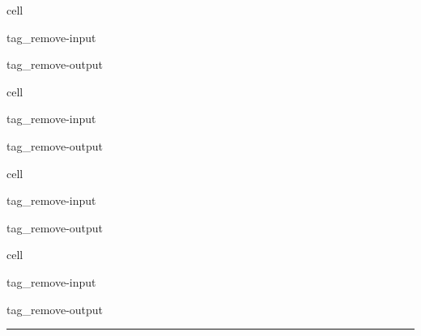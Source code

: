 \documentclass[letterpaper,10pt,english]{jupyterBook}
\begin{document}
\begin{sphinxuseclass}{cell}
\begin{sphinxuseclass}{tag_remove-input}
\begin{sphinxuseclass}{tag_remove-output}
\end{sphinxuseclass}
\end{sphinxuseclass}
\end{sphinxuseclass}
\begin{sphinxuseclass}{cell}
\begin{sphinxuseclass}{tag_remove-input}
\begin{sphinxuseclass}{tag_remove-output}
\end{sphinxuseclass}
\end{sphinxuseclass}
\end{sphinxuseclass}
\begin{sphinxuseclass}{cell}
\begin{sphinxuseclass}{tag_remove-input}
\begin{sphinxuseclass}{tag_remove-output}
\end{sphinxuseclass}
\end{sphinxuseclass}
\end{sphinxuseclass}
\begin{sphinxuseclass}{cell}
\begin{sphinxuseclass}{tag_remove-input}
\begin{sphinxuseclass}{tag_remove-output}
\end{sphinxuseclass}
\end{sphinxuseclass}
\end{sphinxuseclass}

\bigskip\hrule\bigskip








\renewcommand{\indexname}{Index}
\printindex
\end{document}
